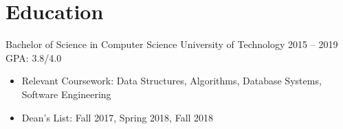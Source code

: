 \section{Education}

\educationitem
    {Bachelor of Science in Computer Science}    %
    {University of Technology}                   %
    {2015 -- 2019}                             %
    {GPA: 3.8/4.0}                             %

\begin{itemize}
    \item Relevant Coursework: Data Structures, Algorithms, Database Systems, Software Engineering
    \item Dean's List: Fall 2017, Spring 2018, Fall 2018
\end{itemize}